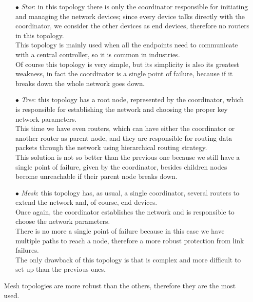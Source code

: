 \documentclass[12pt]{report}
\begin{document}
{\begin{itemize}
\setlength{\itemindent}{+4mm}
\item[$\bullet$] \emph{Star}: in this topology there is only the coordinator responsible for initiating and managing the network devices; since every device talks directly with the coordinator, we consider the other devices as end devices, therefore no routers in this topology.\\
This topology is mainly used when all the endpoints need to communicate with a central controller, so it is common in industries.\\
Of course this topology is very simple, but its simplicity is also its greatest weakness, in fact the coordinator is a single point of failure, because if it breaks down the whole network goes down.

\item[$\bullet$] \emph{Tree}: this topology has a root node, represented by the coordinator, which is responsible for establishing the network and choosing the proper key network parameters.\\
This time we have even routers, which can have either the coordinator or another router as parent node, and they are responsible for routing data packets through the network using hierarchical routing strategy.\\
This solution is not so better than the previous one because we still have a single point of failure, given by the coordinator, besides children nodes become unreachable if their parent node breaks down.

\item[$\bullet$] \emph{Mesh}: this topology has, as usual, a single coordinator, several routers to extend the network and, of course, end devices.\\
Once again, the coordinator establishes the network and is responsible to choose the network parameters.\\
There is no more a single point of failure because in this case we have multiple paths to reach a node, therefore a more robust protection from link failures.\\
The only drawback of this topology is that is complex and more difficult to set up than the previous ones.\\
\end{itemize}

Mesh topologies are more robust than the others, therefore they are the most used.\\

}
\end{document}
